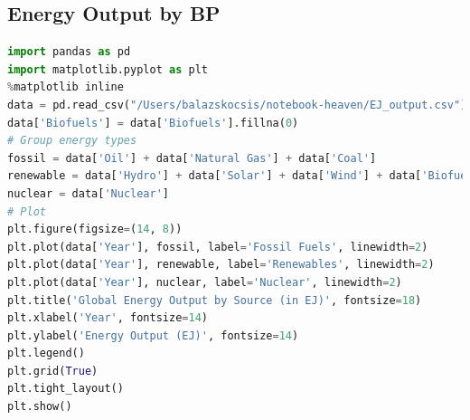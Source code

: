 \documentclass[a4paper,12pt]{article}
\begin{document}
\subsection{Energy Output by BP}
\begin{lstlisting}[language=Python, caption={Python code for bootstrapped 95\% CIs for EROI survival curves}, label={lst:eroi_code}]
import pandas as pd
import matplotlib.pyplot as plt
%matplotlib inline
data = pd.read_csv("/Users/balazskocsis/notebook-heaven/EJ_output.csv")
data['Biofuels'] = data['Biofuels'].fillna(0)
# Group energy types
fossil = data['Oil'] + data['Natural Gas'] + data['Coal']
renewable = data['Hydro'] + data['Solar'] + data['Wind'] + data['Biofuels']
nuclear = data['Nuclear']
# Plot
plt.figure(figsize=(14, 8))
plt.plot(data['Year'], fossil, label='Fossil Fuels', linewidth=2)
plt.plot(data['Year'], renewable, label='Renewables', linewidth=2)
plt.plot(data['Year'], nuclear, label='Nuclear', linewidth=2)
plt.title('Global Energy Output by Source (in EJ)', fontsize=18)
plt.xlabel('Year', fontsize=14)
plt.ylabel('Energy Output (EJ)', fontsize=14)
plt.legend()
plt.grid(True)
plt.tight_layout()
plt.show()
\end{lstlisting}

\end{document}
